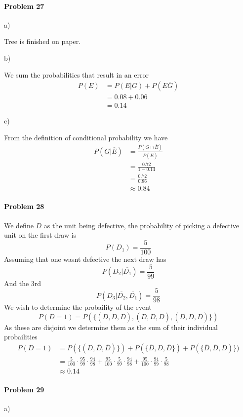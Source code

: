 \paragraph{Problem 27}
a)

Tree is finished on paper.

b) 

We sum the probabilities that result in an error
\begin{align*}
    P(E)&=P(E|G)+P(E\overline{G}) \\
        &=0.08+0.06 \\
        &=0.14
\end{align*}

c)

From the definition of conditional probability we have
\begin{align*}
    P(G|\overline{E})&=\frac{P(G\cap\overline{E})}{P(\overline{E})} \\
                     &=\frac{0.72}{1-0.14} \\
                     &=\frac{0.72}{0.86} \\
                     &\approx 0.84
\end{align*}
\paragraph{Problem 28}
We define $D$ as the unit being defective, the probability of picking a defective unit on the first draw is
\[
    P(D_1)=\frac{5}{100}
\]
Assuming that one wasnt defective the next draw has
\[
    P(D_2|\overline{D_1})=\frac{5}{99}
\]
And the 3rd
\[
    P(D_3|\overline{D_2},\overline{D_1})=\frac{5}{98}
\]
We wish to determine the probaility of the event
\[
    P(D=1)=P(\{(D,\overline{D},\overline{D}),(\overline{D},D,\overline{D}),(\overline{D},\overline{D},D)\})
\]
As these are disjoint we determine them as the sum of their individual probailities
\begin{align*}
P(D=1)&=P(\{(D,\overline{D},\overline{D})\})+P(\{\overline{D},D,\overline{D}\})+P(\{\overline{D},\overline{D},D)\}) \\
      &=\frac{5}{100}\cdot\frac{95}{99}\cdot\frac{94}{98}+\frac{95}{100}\cdot\frac{5}{99}\cdot\frac{94}{98}+\frac{95}{100}\cdot\frac{94}{99}\cdot\frac{5}{98} \\
      &\approx 0.14
\end{align*}
\paragraph{Problem 29}
a)

